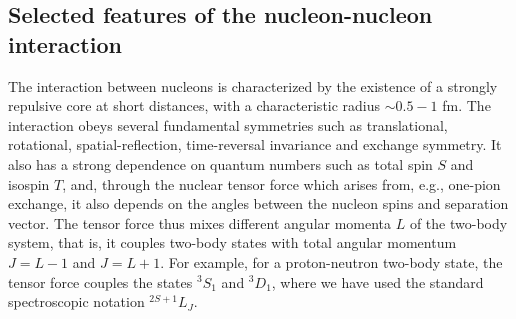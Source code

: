 \documentclass[rmp,aps,floatfix]{revtex4}
\begin{document}
\subsection{Selected features of the nucleon-nucleon interaction}
\label{subsec:NN_to_pairing_sec2}


The interaction between nucleons is characterized 
by the existence of a strongly repulsive core at short distances,
with a characteristic radius $\sim 0.5-1$ fm. 
The interaction 
obeys several fundamental symmetries such as translational,
rotational, spatial-reflection, time-reversal invariance
and exchange symmetry. It also has 
a strong dependence on quantum numbers such as 
total spin $S$ and isospin $T$, and, 
through the nuclear tensor force
which arises from, e.g., one-pion exchange, 
it also depends on the angles between the nucleon spins and
separation vector. The tensor force thus mixes different angular 
momenta $L$ of the two-body system, that is, it couples two-body states
with 
total angular momentum
$J=L-1$ and $J=L+1$.
For example, for a proton-neutron two-body state, the tensor
force couples the states
$^3S_1$ and $^3D_1$, where we have used the standard spectroscopic
notation $^{2S+1}L_J$. 
\end{document}
